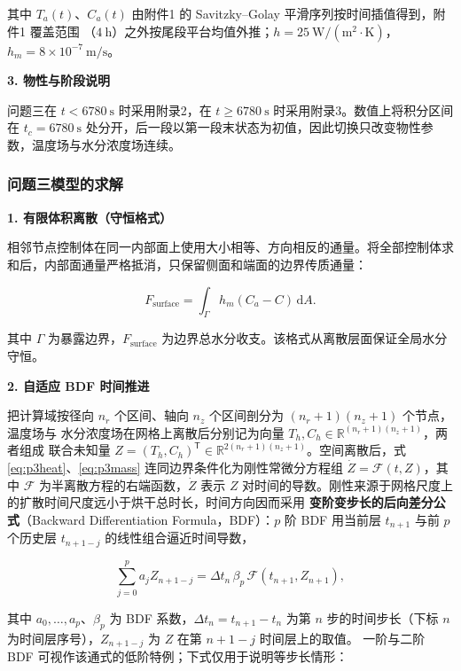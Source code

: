 \documentclass[12pt,a4paper]{ctexart}
\begin{document}
其中 $T_a(t)$、$C_a(t)$ 由附件1 的 Savitzky--Golay 平滑序列按时间插值得到，附件1 覆盖范围
（$4\ \mathrm{h}$）之外按尾段平台均值外推；$h=25\ \mathrm{W/(m^2\cdot K)}$，
$h_m=8\times10^{-7}\ \mathrm{m/s}$。

\textbf{3. 物性与阶段说明}

问题三在 $t<6780\ \mathrm{s}$ 时采用附录2，在 $t\ge6780\ \mathrm{s}$ 时采用附录3。数值上将积分区间在 $t_c=6780\ \mathrm{s}$ 处分开，后一段以第一段末状态为初值，因此切换只改变物性参数，温度场与水分浓度场连续。



\subsubsection{问题三模型的求解}

\textbf{1. 有限体积离散（守恒格式）}

相邻节点控制体在同一内部面上使用大小相等、方向相反的通量。将全部控制体求和后，内部面通量严格抵消，只保留侧面和端面的边界传质通量：

\begin{equation}
F_{\mathrm{surface}}
=\int_{\Gamma}h_m\left(C_a-C\right)\,\mathrm dA.
\label{eq:p3boundaryflux}
\end{equation}

其中 $\Gamma$ 为暴露边界，$F_{\mathrm{surface}}$ 为边界总水分收支。该格式从离散层面保证全局水分守恒。

\textbf{2. 自适应 BDF 时间推进}

把计算域按径向 $n_r$ 个区间、轴向 $n_z$ 个区间剖分为 $(n_r+1)(n_z+1)$ 个节点，温度场与
水分浓度场在网格上离散后分别记为向量 $T_h,C_h\in\mathbb{R}^{(n_r+1)(n_z+1)}$，两者组成
联合未知量 $Z=(T_h,C_h)^{\mathsf T}\in\mathbb{R}^{2(n_r+1)(n_z+1)}$。空间离散后，式
\eqref{eq:p3heat}、\eqref{eq:p3mass} 连同边界条件化为刚性常微分方程组
$\dot Z=\mathcal{F}(t,Z)$，其中 $\mathcal{F}$ 为半离散方程的右端函数，$\dot Z$ 表示 $Z$
对时间的导数。刚性来源于网格尺度上的扩散时间尺度远小于烘干总时长，时间方向因而采用
\textbf{变阶变步长的后向差分公式}（Backward Differentiation Formula，BDF）：$p$ 阶 BDF
用当前层 $t_{n+1}$ 与前 $p$ 个历史层 $t_{n+1-j}$ 的线性组合逼近时间导数，

\begin{equation}
\sum_{j=0}^{p}a_{j}Z_{n+1-j}
=
\Delta t_{n}\,\beta_{p}\,
\mathcal{F}\!\left(t_{n+1},Z_{n+1}\right),
\label{eq:p3bdf}
\end{equation}

其中 $a_{0},\dots,a_{p}$、$\beta_{p}$ 为 BDF 系数，$\Delta t_{n}=t_{n+1}-t_{n}$ 为第 $n$
步的时间步长（下标 $n$ 为时间层序号），$Z_{n+1-j}$ 为 $Z$ 在第 $n+1-j$ 时间层上的取值。
一阶与二阶 BDF 可视作该通式的低阶特例；下式仅用于说明等步长情形：
\end{document}
